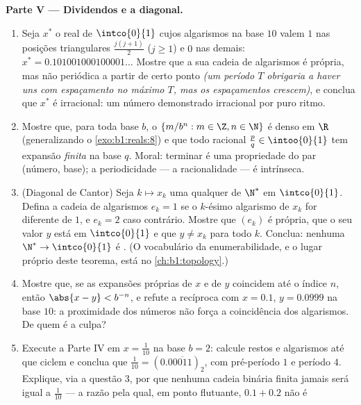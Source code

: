 \begin{problem}
\medskip
\noindent\textbf{Parte V --- Dividendos e a diagonal.}
\begin{enumerate}
  \item Seja $x^*$ o real de $\intco{0}{1}$ cujos algarismos na base $10$
        valem $1$ nas posições triangulares $\frac{j(j +
        1)}{2}$
        ($j \geq 1$) e $0$ nas demais: $x^* =
        0.101001000100001\dots$ Mostre que a sua cadeia de algarismos é
        própria, mas não periódica a partir de certo ponto \emph{(um
        período $T$ obrigaria a haver uns com espaçamento no máximo $T$,
        mas os espaçamentos crescem)}, e conclua que $x^*$ é irracional:
        um número demonstrado irracional por puro ritmo.
  \item Mostre que, para toda base $b$, o  $\{m/b^n : m \in \Z,
        n \in \N\}$ é denso em $\R$ (generalizando o
        \cref{exo:b1:reals:8}) e que todo racional $\frac pq
        \in \intoo{0}{1}$ tem expansão \emph{finita} na
        base $q$. Moral: terminar é uma propriedade do par
        (número, base); a periodicidade --- a racionalidade --- é
        intrínseca.
  \item (Diagonal de Cantor) Seja $k \mapsto x_k$ uma  qualquer de
        $\N^*$ em $\intco{0}{1}$. Defina a cadeia de algarismos $e_k =
        1$ se o $k$-ésimo algarismo de $x_k$ for diferente de $1$, e
        $e_k = 2$ caso contrário. Mostre que $(e_k)$ é própria, que
        o seu valor $y$ está em $\intco{0}{1}$ e que $y \neq
        x_k$ para todo $k$. Conclua: nenhuma  $\N^* \to
        \intco{0}{1}$ é . (O vocabulário da
        enumerabilidade, e o lugar próprio deste teorema, está no
        \cref{ch:b1:topology}.)
  \item Mostre que, se as expansões próprias de $x$ e de $y$ coincidem
        até o índice $n$, então $\abs{x - y} < b^{-n}$, e refute a
        recíproca com $x = 0.1$, $y = 0.0999$ na base $10$:
        a proximidade dos números não força a coincidência dos algarismos.
        De quem é a culpa?
  \item Execute a Parte IV em $x = \frac{1}{10}$ na base $b = 2$:
        calcule restos e algarismos até que ciclem e
        conclua que $\frac{1}{10} = (0.0\overline{0011})_2$, com
        pré-período $1$ e período $4$. Explique, via a questão 3, por que
        nenhuma cadeia binária finita jamais será igual a $\frac{1}{10}$
        --- a razão pela qual, em ponto flutuante, $0.1 + 0.2$ não é

\end{enumerate}
\end{problem}
